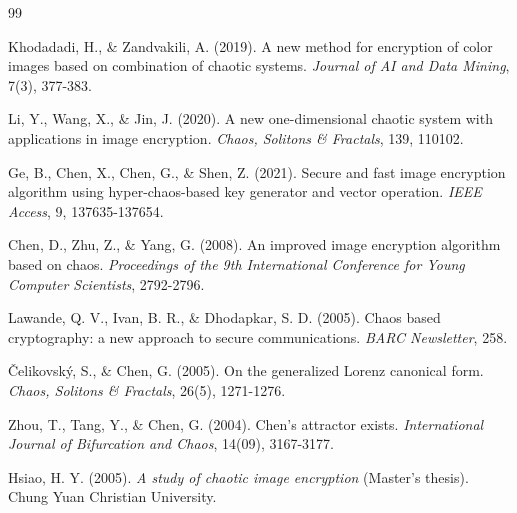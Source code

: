 \begin{thebibliography}{99}
\begin{LTRbibitems}
 Khodadadi, H., \& Zandvakili, A. (2019). A new method for encryption of color images based on combination of chaotic systems. \textit{Journal of AI and Data Mining}, 7(3), 377-383.
\end{LTRbibitems}

\begin{LTRbibitems}
 Li, Y., Wang, X., \& Jin, J. (2020). A new one-dimensional chaotic system with applications in image encryption. \textit{Chaos, Solitons \& Fractals}, 139, 110102.
\end{LTRbibitems}

\begin{LTRbibitems}
 Ge, B., Chen, X., Chen, G., \& Shen, Z. (2021). Secure and fast image encryption algorithm using hyper-chaos-based key generator and vector operation. \textit{IEEE Access}, 9, 137635-137654.
\end{LTRbibitems}

\begin{LTRbibitems}
 Chen, D., Zhu, Z., \& Yang, G. (2008). An improved image encryption algorithm based on chaos. \textit{Proceedings of the 9th International Conference for Young Computer Scientists}, 2792-2796.
\end{LTRbibitems}

\begin{LTRbibitems}
 Lawande, Q. V., Ivan, B. R., \& Dhodapkar, S. D. (2005). Chaos based cryptography: a new approach to secure communications. \textit{BARC Newsletter}, 258.
\end{LTRbibitems}

\begin{LTRbibitems}
 Čelikovský, S., \& Chen, G. (2005). On the generalized Lorenz canonical form. \textit{Chaos, Solitons \& Fractals}, 26(5), 1271-1276.
\end{LTRbibitems}

\begin{LTRbibitems}
 Zhou, T., Tang, Y., \& Chen, G. (2004). Chen's attractor exists. \textit{International Journal of Bifurcation and Chaos}, 14(09), 3167-3177.
\end{LTRbibitems}

\begin{LTRbibitems}
 Hsiao, H. Y. (2005). \textit{A study of chaotic image encryption} (Master's thesis). Chung Yuan Christian University.
\end{LTRbibitems}


\end{thebibliography}
